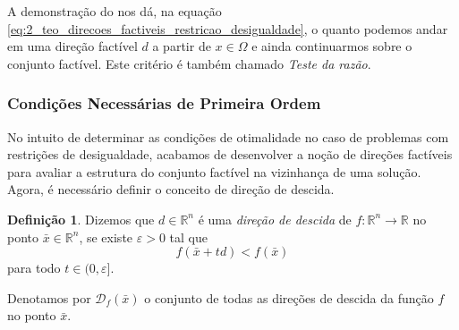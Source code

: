 \documentclass[12pt,a4paper]{scrartcl}
\def\RR{\mathds{R}}
\def\xbar{\bar{x}}
\theoremstyle{definition}%
\newtheorem{defi}{Definição}
\begin{document}
A demonstração do  nos dá, na equação \eqref{eq:2_teo_direcoes_factiveis_restricao_desigualdade}, o quanto podemos andar em uma direção factível $d$ a partir de $x \in \Omega$ e ainda continuarmos sobre o conjunto factível. Este critério é também chamado \emph{Teste da razão}.


\subsubsection{Condições Necessárias de Primeira Ordem}

No intuito de determinar as condições de otimalidade no caso de problemas com restrições de desigualdade, acabamos de desenvolver a noção de direções factíveis para avaliar a estrutura do conjunto factível na vizinhança de uma solução. Agora, é necessário definir o conceito de direção de descida.

\begin{defi} \label{defi:direcao_de_descida}
Dizemos que $d\in \RR^{n}$ é uma \emph{direção de descida} de $f:\RR^{n} \rightarrow \RR$ no ponto $\xbar \in \RR^{n}$, se existe $\varepsilon >0$ tal que
\[
f(\xbar + td) <f(\xbar)
\]
para todo $t \in (0,\varepsilon ]$.
\end{defi}
Denotamos por $\mathcal{D}_{f}(\xbar)$ o conjunto de todas as direções de descida da função $f$ no ponto $\xbar$.
\end{document}
